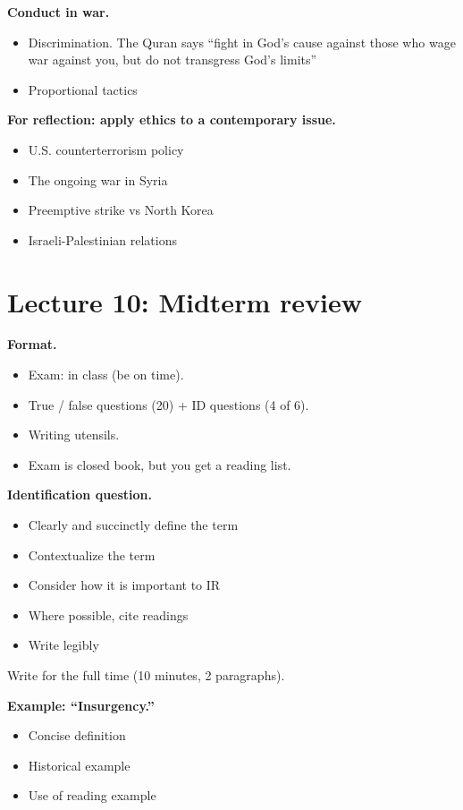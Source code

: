 \documentclass{article}
\begin{document}
{\bf Conduct in war.}

\begin{itemize}
  \item Discrimination.  The Quran says ``fight in God's cause against those who wage war against you, but do not transgress God's limits''
  \item Proportional tactics
\end{itemize}

{\bf For reflection: apply ethics to a contemporary issue.}

\begin{itemize}
  \item U.S. counterterrorism policy
  \item The ongoing war in Syria
  \item Preemptive strike vs North Korea
  \item Israeli-Palestinian relations
\end{itemize}

\section{Lecture 10: Midterm review}

{\bf Format.}
\begin{itemize}
  \item Exam: in class (be on time).
  \item True / false questions (20) + ID questions (4 of 6).
  \item Writing utensils.
  \item Exam is closed book, but you get a reading list.
\end{itemize}

{\bf Identification question.}

\begin{itemize}
  \item Clearly and succinctly define the term
  \item Contextualize the term
  \item Consider how it is important to IR
  \item Where possible, cite readings
  \item Write legibly
\end{itemize}

Write for the full time (10 minutes, 2 paragraphs).

{\bf Example: ``Insurgency.''}

\begin{itemize}
  \item Concise definition
  \item Historical example
  \item Use of reading example 
\end{itemize}
\end{document}
